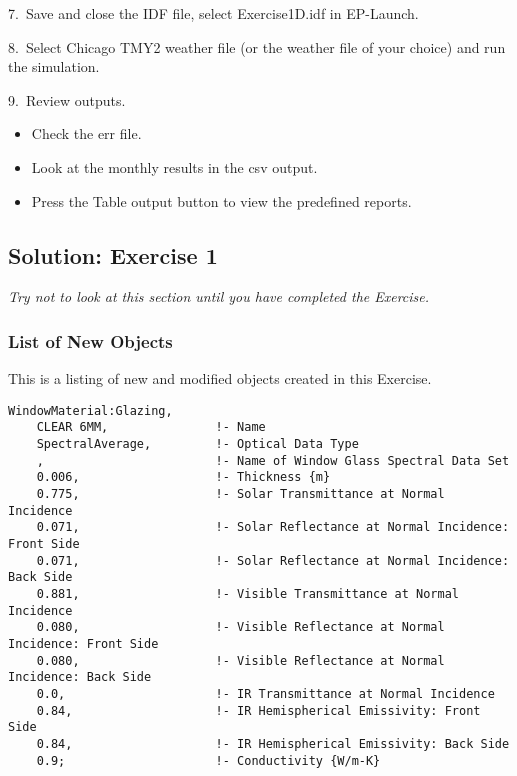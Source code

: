 7.~Save and close the IDF file, select Exercise1D.idf in EP-Launch.

8.~Select Chicago TMY2 weather file (or the weather file of your choice) and run the simulation.

9.~Review outputs.

\begin{itemize}
\item
  Check the err file.
\item
  Look at the monthly results in the csv output.
\item
  Press the Table output button to view the predefined reports.
\end{itemize}

\subsection{Solution: Exercise 1}\label{solution-exercise-1}

\emph{Try not to look at this section until you have completed the Exercise.}

\subsubsection{List of New Objects}\label{list-of-new-objects}

This is a listing of new and modified objects created in this Exercise.

\begin{lstlisting}
WindowMaterial:Glazing,
    CLEAR 6MM,               !- Name
    SpectralAverage,         !- Optical Data Type
    ,                        !- Name of Window Glass Spectral Data Set
    0.006,                   !- Thickness {m}
    0.775,                   !- Solar Transmittance at Normal Incidence
    0.071,                   !- Solar Reflectance at Normal Incidence: Front Side
    0.071,                   !- Solar Reflectance at Normal Incidence: Back Side
    0.881,                   !- Visible Transmittance at Normal Incidence
    0.080,                   !- Visible Reflectance at Normal Incidence: Front Side
    0.080,                   !- Visible Reflectance at Normal Incidence: Back Side
    0.0,                     !- IR Transmittance at Normal Incidence
    0.84,                    !- IR Hemispherical Emissivity: Front Side
    0.84,                    !- IR Hemispherical Emissivity: Back Side
    0.9;                     !- Conductivity {W/m-K}
\end{lstlisting}

